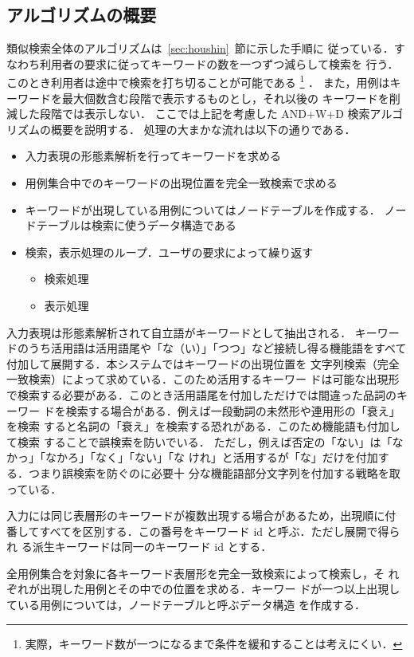 \subsection{アルゴリズムの概要}
\label{sec:jissou}
類似検索全体のアルゴリズムは~\ref{sec:houshin}~節に示した手順に
従っている．すなわち利用者の要求に従ってキーワードの数を一つずつ減らして検索を
行う．このとき利用者は途中で検索を打ち切ることが可能である
\footnote{実際，キーワード数が一つになるまで条件を緩和することは考えにくい．}
．
また，用例はキーワードを最大個数含む段階で表示するものとし，それ以後の
キーワードを削減した段階では表示しない．
ここでは上記を考慮した AND+W+D 検索アルゴリズムの概要を説明する．
処理の大まかな流れは以下の通りである．
\begin{itemize}
 \item 入力表現の形態素解析を行ってキーワードを求める
 \item 用例集合中でのキーワードの出現位置を完全一致検索で求める
 \item キーワードが出現している用例についてはノードテーブルを作成する．
ノードテーブルは検索に使うデータ構造である
 \item 検索，表示処理のループ．ユーザの要求によって繰り返す
 \begin{itemize}
  \item 検索処理
  \item 表示処理
 \end{itemize}
\end{itemize}

入力表現は形態素解析されて自立語がキーワードとして抽出される．
キーワードのうち活用語は活用語尾や「な（い）」「つつ」など接続し得る機能語をすべて付加して展開する．本システムではキーワードの出現位置を
文字列検索（完全一致検索）によって求めている．このため活用するキーワー
ドは可能な出現形
で検索する必要がある．このとき活用語尾を付加しただけでは間違った品詞のキーワー
ドを検索する場合がある．例えば一段動詞の未然形や連用形の「衰え」を検索
すると名詞の「衰え」を検索する恐れがある．このため機能語も付加して検索
することで誤検索を防いでいる．
ただし，例えば否定の「ない」は「なかっ」「なかろ」「なく」「ない」「な
けれ」と活用するが「な」だけを付加する．つまり誤検索を防ぐのに必要十
分な機能語部分文字列を付加する戦略を取っている．

入力には同じ表層形のキーワードが複数出現する場合があるため，出現順に付
番してすべてを区別する．この番号をキーワード id と呼ぶ．ただし展開で得られ
る派生キーワードは同一のキーワード id とする．

全用例集合を対象に各キーワード表層形を完全一致検索によって検索し，そ
れぞれが出現した用例とその中での位置を求める．キーワー
ドが一つ以上出現している用例については，ノードテーブルと呼ぶデータ構造
を作成する．

